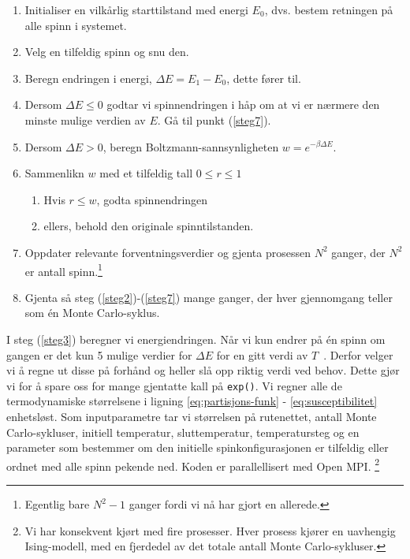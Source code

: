 \documentclass[11pt, twocolumn]{article}
\begin{document}
\begin{enumerate}
\item Initialiser en vilkårlig starttilstand med energi $E_0$, dvs. 
bestem retningen på alle spinn i systemet. 
\item Velg en tilfeldig spinn og snu den.\label{steg2}
\item Beregn endringen i energi, $\Delta E = E_1-E_0$, dette fører til.\label{steg3} 
\item Dersom $\Delta E \leq 0$ godtar vi spinnendringen i håp om at vi
  er nærmere den minste mulige verdien av $E$. Gå til punkt (\ref{steg7}).
\item Dersom $\Delta E > 0 $, beregn Boltzmann-sannsynligheten $w = e^{-\beta\Delta E}$. 
\item Sammenlikn $w$ med et tilfeldig tall $0\leq r\leq 1$ \label{steg6}
\begin{enumerate}
  \item Hvis $r\leq w$, godta spinnendringen
  \item ellers, behold den originale spinntilstanden.
\end{enumerate}
\item Oppdater relevante forventningsverdier og gjenta prosessen\label{steg7}
  $N^2$ ganger, der $N^2$ er antall spinn.\footnote{Egentlig bare $N^2-1$ ganger fordi vi nå har gjort en
  allerede.}
\item Gjenta så steg (\ref{steg2})-(\ref{steg7}) mange ganger, der hver gjennomgang teller som
  én Monte Carlo-syklus.
\end{enumerate}

I steg (\ref{steg3}) beregner vi energiendringen. Når vi kun endrer på
én spinn om gangen er det kun 5 mulige verdier for $\Delta E$ for en
gitt verdi av $T$~\cite[s. 436]{Lecture-notes}. Derfor velger vi å
regne ut disse på forhånd og heller slå opp riktig verdi ved
behov. Dette gjør vi for å spare oss for mange gjentatte kall på \texttt{exp()}. Vi regner alle de termodynamiske størrelsene
i ligning \eqref{eq:partisjons-funk} - \eqref{eq:susceptibilitet} enhetsløst. 
 Som inputparametre tar vi størrelsen på rutenettet, antall Monte Carlo-sykluser,
initiell temperatur, sluttemperatur, temperatursteg og en parameter som bestemmer om den initielle
spinkonfigurasjonen er tilfeldig eller ordnet med alle spinn pekende ned. Koden er parallellisert med Open MPI. \footnote{Vi har konsekvent kjørt med fire
prosesser. Hver prosess kjører en uavhengig Ising-modell, med en fjerdedel av det totale antall Monte Carlo-sykluser. }
\end{document}
